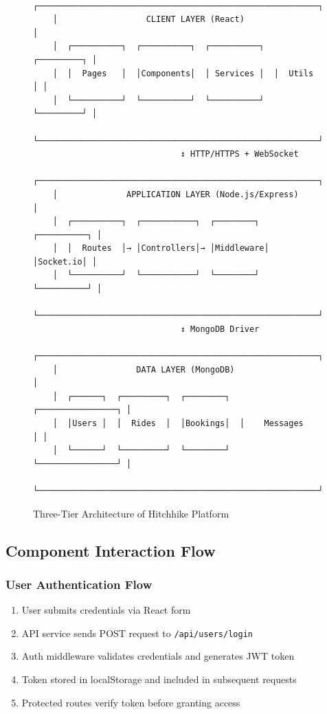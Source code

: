 \documentclass[12pt,a4paper]{article}
\begin{document}
\begin{figure}[H]
    \centering
    \begin{verbatim}
    ┌─────────────────────────────────────────────────────────┐
    │                  CLIENT LAYER (React)                    │
    │  ┌──────────┐  ┌──────────┐  ┌──────────┐  ┌─────────┐ │
    │  │  Pages   │  │Components│  │ Services │  │  Utils  │ │
    │  └──────────┘  └──────────┘  └──────────┘  └─────────┘ │
    └─────────────────────────────────────────────────────────┘
                              ↕ HTTP/HTTPS + WebSocket
    ┌─────────────────────────────────────────────────────────┐
    │              APPLICATION LAYER (Node.js/Express)         │
    │  ┌──────────┐  ┌───────────┐  ┌────────┐  ┌──────────┐ │
    │  │  Routes  │→ │Controllers│→ │Middleware│ │Socket.io│ │
    │  └──────────┘  └───────────┘  └────────┘  └──────────┘ │
    └─────────────────────────────────────────────────────────┘
                              ↕ MongoDB Driver
    ┌─────────────────────────────────────────────────────────┐
    │                DATA LAYER (MongoDB)                      │
    │  ┌──────┐  ┌─────────┐  ┌────────┐  ┌────────────────┐ │
    │  │Users │  │  Rides  │  │Bookings│  │    Messages    │ │
    │  └──────┘  └─────────┘  └────────┘  └────────────────┘ │
    └─────────────────────────────────────────────────────────┘
    \end{verbatim}
    \caption{Three-Tier Architecture of Hitchhike Platform}
\end{figure}

\subsection{Component Interaction Flow}

\subsubsection{User Authentication Flow}
\begin{enumerate}
    \item User submits credentials via React form
    \item API service sends POST request to \texttt{/api/users/login}
    \item Auth middleware validates credentials and generates JWT token
    \item Token stored in localStorage and included in subsequent requests
    \item Protected routes verify token before granting access
\end{enumerate}
\end{document}
